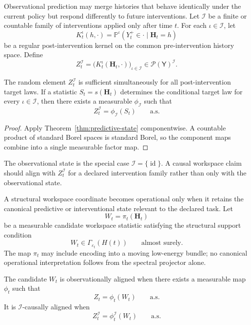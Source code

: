 
Observational prediction may merge histories that behave identically under the
current policy but respond differently to future interventions. Let
\(\mathcal I\) be a finite or countable family of interventions applied only
after time \(t\). For each \(\iota\in\mathcal I\), let
\[
K_t^{\iota}(h,\cdot)
=
\mathbb P^{\iota}(Y_t^+\in\cdot\mid\mathbf H_t=h)
\]
be a regular post-intervention kernel on the common pre-intervention history
space. Define
\[
\boxed{
Z_t^{\mathcal I}
=
\bigl(K_t^{\iota}(\mathbf H_t,\cdot)\bigr)_{\iota\in\mathcal I}
\in
\mathcal P(\mathsf Y)^{\mathcal I}.
}
\]

\begin{corollary}
\label{cor:interventional-state}
The random element \(Z_t^{\mathcal I}\) is sufficient simultaneously for all
post-intervention target laws. If a statistic \(S_t=s(\mathbf H_t)\)
determines the conditional target law for every \(\iota\in\mathcal I\), then
there exists a measurable \(\phi_{\mathcal I}\) such that
\[
Z_t^{\mathcal I}=\phi_{\mathcal I}(S_t)
\qquad\text{a.s.}
\]
\end{corollary}

\begin{proof}
Apply Theorem~\ref{thm:predictive-state} componentwise. A countable product of
standard Borel spaces is standard Borel, so the component maps combine into a
single measurable factor map.
\end{proof}

The observational state is the special case
\(\mathcal I=\{\operatorname{id}\}\). A causal workspace claim should align
with \(Z_t^{\mathcal I}\) for a declared intervention family rather than only
with the observational state.


A structural workspace coordinate becomes operational only when it retains the
canonical predictive or interventional state relevant to the declared task.
Let
\[
W_t=\pi_t(\mathbf H_t)
\]
be a measurable candidate workspace statistic satisfying the structural support
condition
\[
W_t\in\Gamma_{\varepsilon_t}(H(t))
\qquad\text{almost surely}.
\]
The map \(\pi_t\) may include encoding into a moving low-energy bundle; no
canonical operational interpretation follows from the spectral projector
alone.

\begin{definition}
The candidate \(W_t\) is observationally aligned when there exists a measurable
map \(\phi_t\) such that
\[
Z_t=\phi_t(W_t)
\qquad\text{a.s.}
\]
It is \(\mathcal I\)-causally aligned when
\[
Z_t^{\mathcal I}=\phi_t^{\mathcal I}(W_t)
\qquad\text{a.s.}
\]
\end{definition}

